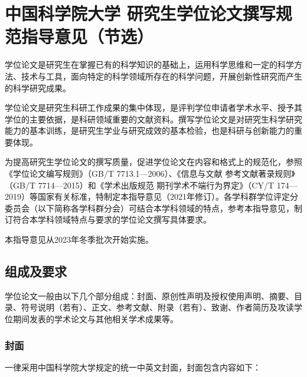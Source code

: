 \chapter{中国科学院大学
研究生学位论文撰写规范指导意见（节选）}
{
\let\cleardoublepage\relax
}
学位论文是研究生在掌握已有的科学知识的基础上，运用科学思维和一定的科学方法、技术与工具，面向特定的科学领域所存在的科学问题，开展创新性研究而产生的科学研究成果。

学位论文是研究生科研工作成果的集中体现，是评判学位申请者学术水平、授予其学位的主要依据，是科研领域重要的文献资料。撰写学位论文是对研究生科学研究能力的基本训练，是研究生学业与研究成效的基本检验，也是科研与创新能力的重要体现。

为提高研究生学位论文的撰写质量，促进学位论文在内容和格式上的规范化，参照《学位论文编写规则》（GB/T 7713.1—2006）、《信息与文献 参考文献著录规则》（GB/T 7714—2015）和《学术出版规范 期刊学术不端行为界定》（CY/T 174—2019）等国家有关标准，特制定本指导意见（2021年修订）。各学科群学位评定分委员会（以下简称各学科群分会）可结合本学科领域的特点，参考本指导意见，制订符合本学科领域特点与要求的学位论文撰写具体要求。

本指导意见从2023年冬季批次开始实施。

\section{组成及要求}
学位论文一般由以下几个部分组成：封面、原创性声明及授权使用声明、摘要、目录、符号说明（若有）、正文、参考文献、附录（若有）、致谢、作者简历及攻读学位期间发表的学术论文与其他相关学术成果等。
\subsection{封面}
一律采用中国科学院大学规定的统一中英文封面，封面包含内容如下：

